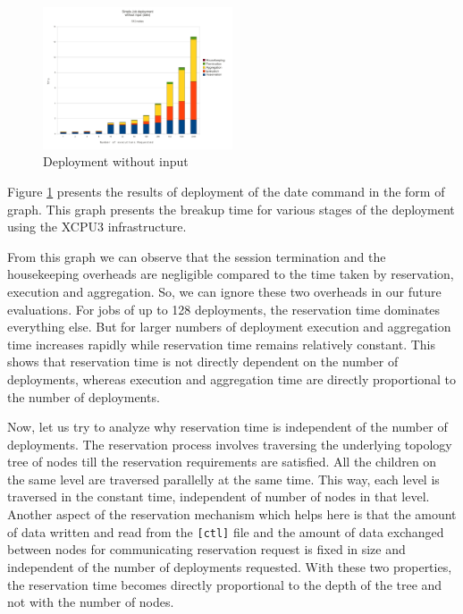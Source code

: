 \begin{figure}[h]
  \begin{center}
    \leavevmode
      \includegraphics[height=0.2\textheight,width=0.5\textwidth]
		{./img/date_graph}
    \caption{Deployment without input}
    \label{fig:date_graph}
  \end{center}
\end{figure}

Figure \ref{fig:date_graph} presents the results of deployment of the date
command in the form of graph.  This graph presents the breakup time for various
stages of the deployment using the XCPU3 infrastructure.

From this graph we can observe that the session termination and the housekeeping
overheads are negligible compared to the time taken by reservation, execution
and aggregation.  So, we can ignore these two overheads in our future
evaluations.  For jobs of up to 128 deployments, the reservation time dominates
everything else.  But for larger numbers of deployment execution and
aggregation time increases rapidly while reservation time remains relatively
constant. This shows that reservation time is not directly dependent on
the number of deployments, whereas execution and aggregation time are directly
proportional to the number of deployments.

Now, let us try to analyze why reservation time is independent of the number of
deployments.  The reservation process involves traversing the underlying
topology tree of nodes till the reservation requirements are satisfied.  All the
children on the same level are traversed parallelly at the same time.  This way,
each level is traversed in the constant time, independent of number of nodes in
that level.  Another aspect of the reservation mechanism which helps here is
that the amount of data written and read from the \texttt{[ctl]} file and the
amount of data exchanged between nodes for communicating reservation request is
fixed in size and independent of the number of deployments requested.  With
these two properties, the reservation time becomes directly proportional to the
depth of the tree and not with the number of nodes.

